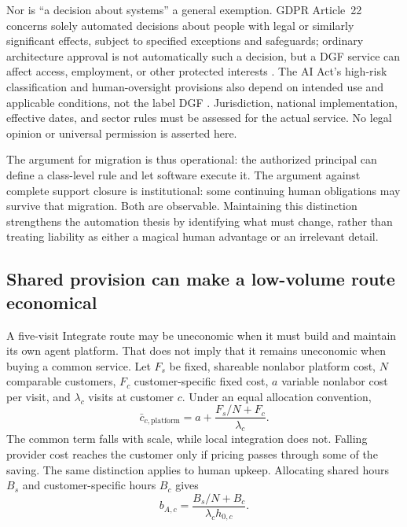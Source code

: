 Nor is ``a decision about systems'' a general exemption. GDPR Article~22 concerns solely automated
decisions about people with legal or similarly significant effects, subject to specified exceptions and
safeguards; ordinary architecture approval is not automatically such a decision, but a DGF service can
affect access, employment, or other protected interests \citep{gdpr}. The AI Act's high-risk
classification and human-oversight provisions also depend on intended use and applicable conditions,
not the label DGF \citep[Arts.~6, 14 and Annex~III]{aiact}. Jurisdiction, national implementation,
effective dates, and sector rules must be assessed for the actual service. No legal opinion or
universal permission is asserted here.

The argument for migration is thus operational: the authorized principal can define a class-level rule
and let software execute it. The argument against complete support closure is institutional: some
continuing human obligations may survive that migration. Both are observable. Maintaining this
distinction strengthens the automation thesis by identifying what must change, rather than treating
liability as either a magical human advantage or an irrelevant detail.

\subsection{Shared provision can make a low-volume route economical}
\label{sec:provision}

A five-visit Integrate route may be uneconomic when it must build and maintain its own agent
platform. That does not imply that it remains uneconomic when buying a common service. Let $F_s$ be
fixed, shareable nonlabor platform cost, $N$ comparable customers, $F_c$ customer-specific fixed cost,
$a$ variable nonlabor cost per visit, and $\lambda_c$ visits at customer $c$. Under an equal allocation
convention,
\begin{equation}
\bar c_{c,\mathrm{platform}} = a + \frac{F_s/N + F_c}{\lambda_c}. \label{eq:platformcost}
\end{equation}
The common term falls with scale, while local integration does not. Falling provider cost reaches the
customer only if pricing passes through some of the saving. The same distinction applies to human
upkeep. Allocating shared hours $B_s$ and customer-specific hours $B_c$ gives
\begin{equation}
b_{A,c} = \frac{B_s/N + B_c}{\lambda_c h_{0,c}}. \label{eq:sharedupkeep}
\end{equation}

